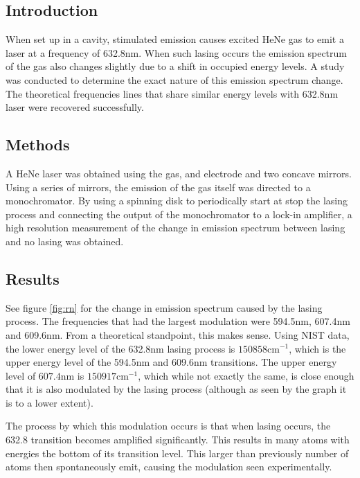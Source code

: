 \documentclass[letterpaper, reqno,11pt]{article}
\begin{document}
\subsection{Introduction}

When set up in a cavity, stimulated emission causes excited HeNe gas to emit a laser at a frequency of 632.8nm. When such lasing occurs the emission spectrum of the gas also changes slightly due to a shift in occupied energy levels. A study was conducted to determine the exact nature of this emission spectrum change. The theoretical frequencies lines that share similar energy levels with 632.8nm laser were recovered successfully.

\subsection{Methods}

A HeNe laser was obtained using the gas, and electrode and two concave mirrors. Using a series of mirrors, the emission of the gas itself was directed to a monochromator. By using a spinning disk to periodically start at stop the lasing process and connecting the output of the monochromator to a lock-in amplifier, a high resolution measurement of the change in emission spectrum between lasing and no lasing was obtained.

\subsection{Results}

See figure \ref{fig:rn} for the change in emission spectrum caused by the lasing process. The frequencies that had the largest modulation were 594.5nm, 607.4nm and 609.6nm. From a theoretical standpoint, this makes sense. Using NIST data, the lower energy level of the 632.8nm lasing process is $150858\text{cm}^{-1}$, which is the upper energy level of the 594.5nm and 609.6nm transitions. The upper energy level of $607.4$nm is $150917\text{cm}^{-1}$, which while not exactly the same, is close enough that it is also modulated by the lasing process (although as seen by the graph it is to a lower extent).

The process by which this modulation occurs is that when lasing occurs, the 632.8 transition becomes amplified significantly. This results in many atoms with energies the bottom of its transition level. This larger than previously number of atoms then spontaneously emit, causing the modulation seen experimentally. 
\end{document}
